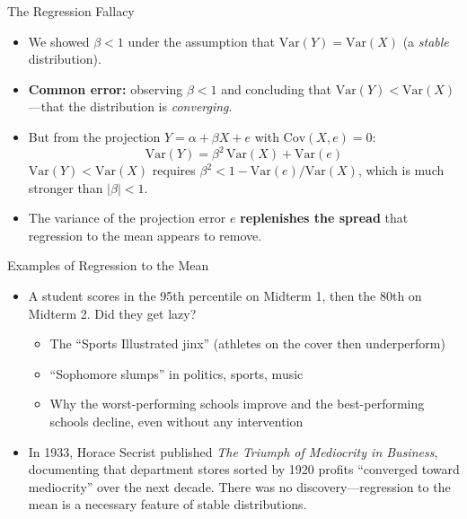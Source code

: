 \documentclass[aspectratio=169, handout]{beamer}
\numberwithin{equation}{section}
\begin{document}
\begin{frame}{The Regression Fallacy}
\begin{itemize}
\item We showed $\beta < 1$ under the assumption that $\text{Var}(Y) = \text{Var}(X)$ (a \emph{stable} distribution).\pause
\item \textbf{Common error:} observing $\beta < 1$ and concluding that $\text{Var}(Y) < \text{Var}(X)$---that the distribution is \emph{converging}.\pause
\item But from the projection $Y = \alpha + \beta X + e$ with $\text{Cov}(X,e)=0$:
$$\text{Var}(Y) = \beta^2\,\text{Var}(X) + \text{Var}(e)$$
$\text{Var}(Y) < \text{Var}(X)$ requires $\beta^2 < 1 - \text{Var}(e)/\text{Var}(X)$, which is much stronger than $|\beta|<1$.\pause
\item The variance of the projection error $e$ \textbf{replenishes the spread} that regression to the mean appears to remove.
\end{itemize}
\end{frame}

\begin{frame}{Examples of Regression to the Mean}
\begin{itemize}
\item A student scores in the 95th percentile on Midterm 1, then the 80th on Midterm 2. Did they get lazy?\pause
\begin{itemize}
\item The ``Sports Illustrated jinx'' (athletes on the cover then underperform)
\item ``Sophomore slumps'' in politics, sports, music
\item Why the worst-performing schools improve and the best-performing schools decline, even without any intervention
\end{itemize}\pause
\item In 1933, Horace Secrist published \emph{The Triumph of Mediocrity in Business}, documenting that department stores sorted by 1920 profits ``converged toward mediocrity'' over the next decade. There was no discovery---regression to the mean is a necessary feature of stable distributions.
\end{itemize}
\end{frame}
\end{document}
